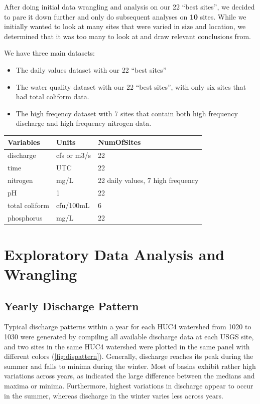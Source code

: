 \documentclass[12pt,]{article}
\begin{document}
After doing initial data wrangling and analysis on our 22 ``best
sites'', we decided to pare it down further and only do subsequent
analyses on \textbf{10} sites. While we initially wanted to look at many
sites that were varied in size and location, we determined that it was
too many to look at and draw relevant conclusions from.

We have three main datasets:

\begin{itemize}
\item
  The daily values dataset with our 22 ``best sites''
\item
  The water quality dataset with our 22 ``best sites'', with only six
  sites that had total coliform data.
\item
  The high freqency dataset with 7 sites that contain both high
  frequency discharge and high frequency nitrogen data.
\end{itemize}

\begin{table}[H]
\centering
\begin{tabular}{l|l|l}
\hline
Variables & Units & NumOfSites\\
\hline
discharge & cfs or m3/s & 22\\
\hline
time & UTC & 22\\
\hline
nitrogen & mg/L & 22 daily values, 7 high frequency\\
\hline
pH & 1 & 22\\
\hline
total coliform & cfu/100mL & 6\\
\hline
phosphorus & mg/L & 22\\
\hline
\end{tabular}
\end{table}

\newpage

\hypertarget{exploratory-data-analysis-and-wrangling}{%
\section{Exploratory Data Analysis and
Wrangling}\label{exploratory-data-analysis-and-wrangling}}

\hypertarget{yearly-discharge-pattern}{%
\subsection{Yearly Discharge Pattern}\label{yearly-discharge-pattern}}

Typical discharge patterns within a year for each HUC4 watershed from
1020 to 1030 were generated by compiling all available discharge data at
each USGS site, and two sites in the same HUC4 watershed were plotted in
the same panel with different colors (\autoref{fig:dispattern}).
Generally, discharge reaches its peak during the summer and falls to
minima during the winter. Most of basins exhibit rather high variations
across years, as indicated the large difference between the medians and
maxima or minima. Furthermore, highest variations in discharge appear to
occur in the summer, whereas discharge in the winter varies less across
years.
\end{document}
